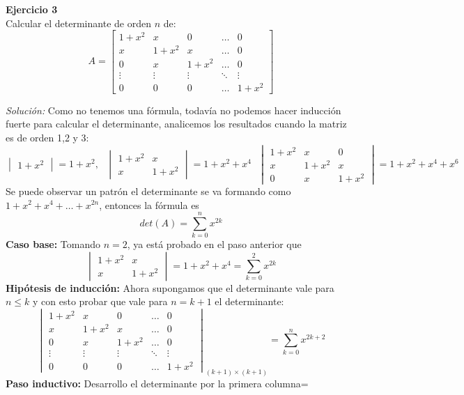 \documentclass{article}
\newenvironment{problem}[2][Ejercicio]
    { \begin{mdframed}[backgroundcolor=gray!20] \textbf{#1 #2} \\}
    {  \end{mdframed}}
\newenvironment{solution}
    {\textit{Solución:}}
    {}
\begin{document}
\begin{problem}{3}
    Calcular el determinante de orden $n$ de:
\[
A =
\begin{bmatrix}
1 + x^2 & x & 0 & \dots & 0 \\
x & 1 + x^2 & x & \dots & 0 \\
0 & x & 1 + x^2 & \dots & 0 \\
\vdots & \vdots & \vdots & \ddots & \vdots \\
0 & 0 & 0 & \dots & 1+x^2
\end{bmatrix}
\]
\end{problem}
\begin{solution}
    Como no tenemos una fórmula, todavía no podemos hacer inducción fuerte para calcular el determinante, analicemos los resultados cuando la matriz es de orden 1,2 y 3:
\[
\begin{vmatrix}
1 + x^2
\end{vmatrix} = 1+x^2, \ \ \
\begin{vmatrix}
1 + x^2 & x \\
x & 1+x^2
\end{vmatrix} = 1 + x^2 + x^4 \ \ \
\begin{vmatrix}
1 + x^2 & x & 0 \\
x & 1+x^2 & x \\
0 & x & 1+x^2
\end{vmatrix} = 1+x^2+x^4+x^6
\]
Se puede observar un patrón el determinante se va formando como $1+x^2+x^4+\dots +x^{2n}$, entonces la fórmula es
\[
det(A) = \sum_{k=0}^{n} x^{2k}
\]
\textbf{Caso base:} Tomando $n=2$, ya está probado en el paso anterior que
\[
\begin{vmatrix}
1 + x^2 & x \\
x & 1+x^2
\end{vmatrix} = 1 + x^2 + x^4 = \sum_{k = 0}^{2} x^{2k}
\]
\textbf{Hipótesis de inducción:} Ahora supongamos que el determinante vale para $n\leq k$ y con esto probar que vale para $n=k+1$ el determinante:
\[
\begin{vmatrix}
1 + x^2 & x & 0 & \dots & 0 \\
x & 1 + x^2 & x & \dots & 0 \\
0 & x & 1 + x^2 & \dots & 0 \\
\vdots & \vdots & \vdots & \ddots & \vdots \\
0 & 0 & 0 & \dots & 1+x^2
\end{vmatrix}_{(k+ 1)\times (k+1)} = \sum_{k = 0}^{n} x^{2k+2}
\]
\textbf{Paso inductivo:} Desarrollo el determinante por la primera columna=
\[
\begin{aligned}

\end{aligned}\]
\end{solution}
\end{document}
